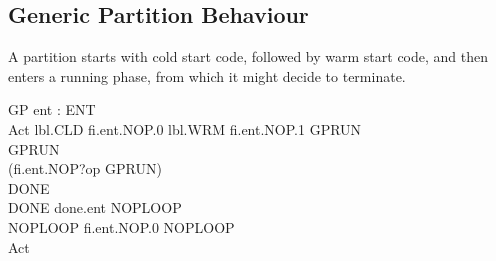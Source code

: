 \subsection{Generic Partition Behaviour} %

A partition starts with cold start code, followed by warm start code,
and then enters a running phase, from which it might decide to terminate.

\begin{circus}
\circprocess GP \circdef ent : ENT \circspot \circbegin\\
  Act \circdef lbl.CLD \then  fi.ent.NOP.0 \then  lbl.WRM \then  fi.ent.NOP.1 \then  GPRUN\\
GPRUN\circdef\\
  (fi.ent.NOP?op \then  GPRUN)\\
   \intchoice DONE\\
   DONE \circdef done.ent \then  NOPLOOP\\
   NOPLOOP \circdef fi.ent.NOP.0 \then  NOPLOOP   \\
   \circspot Act\\
\circend

\end{circus}

